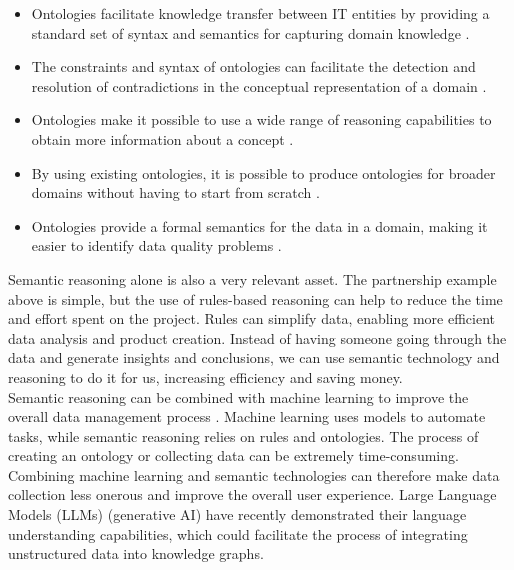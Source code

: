             \begin{itemize}
                \item Ontologies facilitate knowledge transfer between IT entities by providing a standard set of syntax and semantics for capturing domain knowledge \cite{spelten2023simulation}. 
                \item The constraints and syntax of ontologies can facilitate the detection and resolution of contradictions in the conceptual representation of a domain \cite{chen2012recommendation}. 
                \item Ontologies make it possible to use a wide range of reasoning capabilities to obtain more information about a concept \cite{chen2012recommendation}. 
                \item By using existing ontologies, it is possible to produce ontologies for broader domains without having to start from scratch \cite{bizer2008linked}. 
                \item Ontologies provide a formal semantics for the data in a domain, making it easier to identify data quality problems \cite{spelten2023simulation, li2018ontology}.
            \end{itemize}
        
            Semantic reasoning alone is also a very relevant asset. The partnership example above is simple, but the use of rules-based reasoning can help to reduce the time and effort spent on the project. Rules can simplify data, enabling more efficient data analysis and product creation. Instead of having someone going through the data and generate insights and conclusions, we can use semantic technology and reasoning to do it for us, increasing efficiency and saving money.\\
        
            Semantic reasoning can be combined with machine learning to improve the overall data management process \cite{pan2024unifying}. Machine learning uses models to automate tasks, while semantic reasoning relies on rules and ontologies. The process of creating an ontology or collecting data can be extremely time-consuming. Combining machine learning and semantic technologies can therefore make data collection less onerous and improve the overall user experience. Large Language Models (LLMs) (generative AI) have recently demonstrated their language understanding capabilities, which could facilitate the process of integrating unstructured data into knowledge graphs.\\
        
